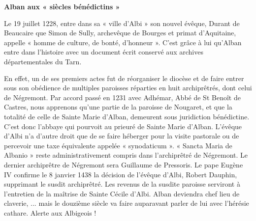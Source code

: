 
\thispagestyle{plain}

\vspace*{12mm}

\begin{center}
    {\Large\bfseries Alban aux « siècles bénédictins »}
\end{center}

\vspace{18mm}

\noindent
Le 19 juillet 1228, entre dans sa « ville d'Albi » son nouvel évêque,
Durant de Beaucaire que Simon de Sully, archevêque de Bourges et
primat d'Aquitaine, appelle « homme de culture, de bonté, d'honneur ».
C'est grâce à lui qu'Alban entre dans l'histoire avec un document écrit
conservé aux archives départementales du Tarn.

\par
En effet, un de ses premiers actes fut de réorganiser le diocèse et
de faire entrer sous son obédience de multiples paroisses réparties
en huit archiprêtrés, dont celui de Négremont. Par accord passé en
1231 avec Adhémar, Abbé de St Benoît de Castres, nous apprenons
qu'une partie de la paroisse de Nougaret, et que la totalité de celle
de Sainte Marie d'Alban, demeurent sous juridiction bénédictine.
C'est donc l'abbaye qui pourvoit au prieuré de Sainte Marie d'Alban.
L'évêque d'Albi n'a d'autre droit que de se faire héberger pour la
visite pastorale ou de percevoir une taxe équivalente appelée
« synodaticum ». « Sancta Maria de Albanio » reste administrativement
compris dans l'archiprêtré de Négremont. Le dernier archiprêtre de
Négremont sera Guillaume de Pressoris. Le pape Eugène IV confirme
le 8 janvier 1438 la décision de l'évêque d'Albi, Robert Dauphin,
supprimant le susdit archiprêtré. Les revenus de la susdite paroisse
serviront à l'entretien de la maîtrise de Sainte Cécile d'Albi.
Alban deviendra chef lieu de claverie, ... mais le douzième siècle
va faire auparavant parler de lui avec l'hérésie cathare. Alerte aux
Albigeois !

\vfill
